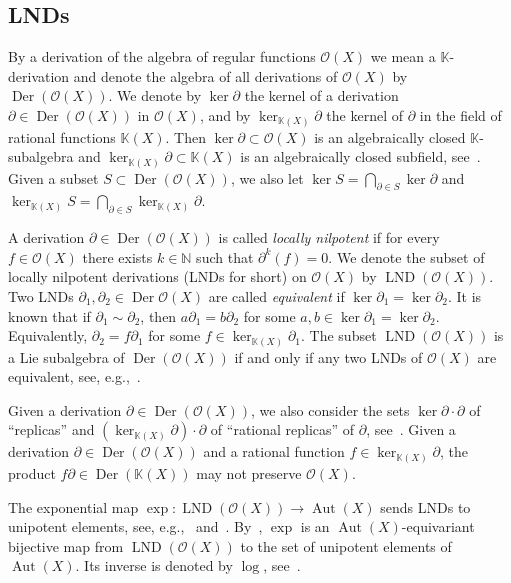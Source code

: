 \documentclass[12pt,a4paper]{amsart}
\theoremstyle{plain}
\theoremstyle{definition}
\theoremstyle{remark}
\def\Aut{\operatorname{Aut}}
\def\Der{\operatorname{Der}}
\def\LND{\operatorname{LND}}
\def\NN{{\mathbb N}}
\def\K{{\mathbb K}}
\def\cO{{\mathcal O}}
\begin{document}
 
 \subsection{LNDs}
 By a derivation of the algebra of regular functions $\cO(X)$ we mean a $\K$-derivation and denote the algebra of all derivations of $\cO(X)$ by $\Der(\cO(X))$.
We denote by $\ker\partial$ the kernel of a derivation $\partial\in\Der(\cO(X))$ in $\cO(X)$, and by $\ker_{\K(X)}\partial$ the kernel of $\partial$ in the field of rational functions $\K(X)$. Then $\ker\partial\subset\cO(X)$ is an algebraically closed $\K$-subalgebra and $\ker_{\K(X)}\partial\subset\K(X)$ is an algebraically closed subfield, see~\cite[Propositions~1.9, 1.12]{Freudenburg}.
Given a subset $S\subset\Der(\cO(X))$, we also let $\ker S=\bigcap_{\partial\in S}\ker \partial$ and $\ker_{\K(X)} S=\bigcap_{\partial\in S}\ker_{\K(X)} \partial$. 


A derivation $\partial\in\Der(\cO(X))$ is called \emph{locally nilpotent} if for every $f\in\cO(X)$ there exists $k\in\NN$ such that $\partial^k(f)=0$.
 We denote the subset of locally nilpotent derivations (LNDs for short) on $\cO(X)$ by $\LND(\cO(X))$.
    Two LNDs $\partial_1,\partial_2\in\Der\cO(X)$ are called \emph{equivalent} if $\ker\partial_1=\ker\partial_2$.
 It is known that if $\partial_1\sim\partial_2$, then $a\partial_1=b\partial_2$ for some $a,b\in\ker\partial_1=\ker\partial_2$. 
 Equivalently, $\partial_2=f\partial_1$ for some $f\in\ker_{\K(X)}\partial_1$. 
The subset $\LND(\cO(X))$ is a Lie subalgebra of $\Der(\cO(X))$ if and only if any two LNDs of $\cO(X)$ are equivalent, see, e.g.,~\cite{PR1}.

     Given a derivation $\partial\in \Der(\cO(X))$, we also consider the sets $\ker\partial\cdot\partial$ of ``replicas'' and $(\ker_{\K(X)}\partial)\cdot\partial$
    of ``rational replicas'' of $\partial$, see~\cite{RvS}.
Given a derivation $\partial\in\Der(\cO(X))$ and a rational function $f\in\ker_{\K(X)}\partial$, the product $f\partial\in \Der(\K(X))$ may not preserve $\cO(X)$.
  

The exponential map $\exp\colon \LND(\cO(X))\to\Aut(X)$ sends LNDs to unipotent elements, see, e.g.,~\cite[Section~1.1.9]{Freudenburg} and~\cite[Section~11.3]{FK}.
 By~\cite[Lemma 11.3.3]{FK}, $\exp$ is an $\Aut(X)$-equivariant bijective map from $\LND(\cO(X))$ to the set of unipotent elements of $\Aut(X)$. Its inverse is denoted by $\log$, see~\cite[Definition 11.3.4]{FK}.

 
 
\end{document}
